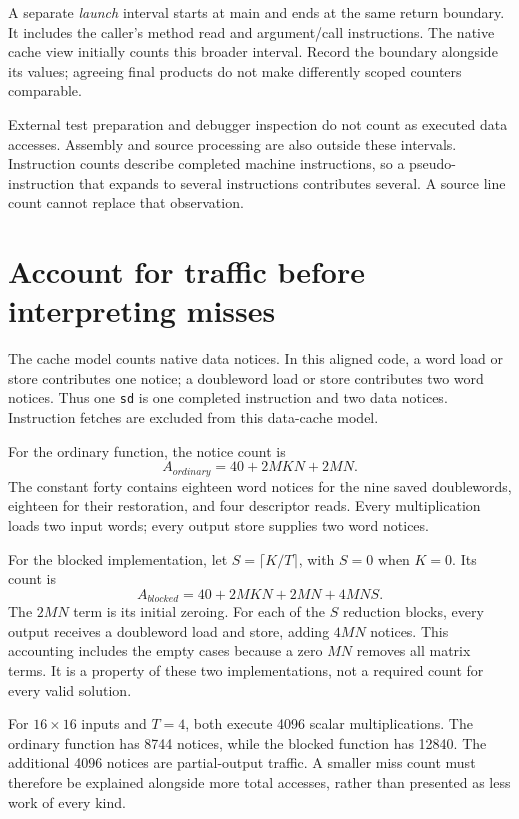 A separate \emph{launch} interval starts at main and ends at the same return
boundary. It includes the caller's method read and argument/call instructions.
The native cache view initially counts this broader interval. Record the boundary
alongside its values; agreeing final products do not make differently scoped
counters comparable.



External test preparation and debugger inspection do not count as executed data
accesses. Assembly and source processing are also outside these intervals.
Instruction counts describe completed machine instructions, so a pseudo-instruction
that expands to several instructions contributes several. A source line count
cannot replace that observation.

\section{Account for traffic before interpreting misses}

The cache model counts native data notices. In this aligned code, a word load or
store contributes one notice; a doubleword load or store contributes two word
notices. Thus one \texttt{sd} is one completed instruction and two data notices.
Instruction fetches are excluded from this data-cache model.

For the ordinary function, the notice count is
\[
  A_{ordinary}=40+2MKN+2MN.
\]
The constant forty contains eighteen word notices for the nine saved doublewords,
eighteen for their restoration, and four descriptor reads. Every multiplication
loads two input words; every output store supplies two word notices.

For the blocked implementation, let $S=\lceil K/T\rceil$, with $S=0$ when $K=0$.
Its count is
\[
  A_{blocked}=40+2MKN+2MN+4MNS.
\]
The $2MN$ term is its initial zeroing. For each of the $S$ reduction blocks, every
output receives a doubleword load and store, adding $4MN$ notices. This accounting
includes the empty cases because a zero $MN$ removes all matrix terms. It is a
property of these two implementations, not a required count for every valid
solution.

For $16\times16$ inputs and $T=4$, both execute 4096 scalar multiplications.
The ordinary function has 8744 notices, while the blocked function has 12840.
The additional 4096 notices are partial-output traffic. A smaller miss count must
therefore be explained alongside more total accesses, rather than presented as
less work of every kind.

